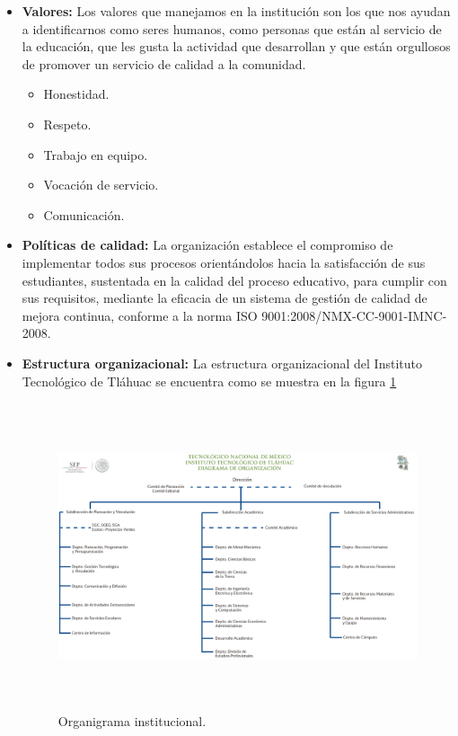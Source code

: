 \begin{itemize}
    \item \textbf{Valores:}  Los valores que manejamos en la instituci\'on son los que nos ayudan a identificarnos como seres humanos, como personas que est\'an al servicio de la educaci\'on, que les gusta la actividad que desarrollan y que est\'an orgullosos de promover un servicio de calidad a la comunidad.
    \begin{itemize}
        \item Honestidad.
        \item Respeto.
        \item Trabajo en equipo.
        \item Vocaci\'on de servicio.
        \item Comunicaci\'on.
    \end{itemize}
    \item \textbf{Pol\'iticas de calidad:} La organizaci\'on establece el compromiso de implementar todos sus procesos orient\'andolos hacia la satisfacci\'on de sus estudiantes, sustentada en la calidad del proceso educativo, para cumplir con sus requisitos, mediante la eficacia de un sistema de gesti\'on de calidad de mejora continua, conforme a la norma ISO 9001:2008/NMX-CC-9001-IMNC-2008.
    
    \item \textbf{Estructura organizacional:} La estructura organizacional del Instituto Tecnol\'ogico de Tl\'ahuac se encuentra como se muestra en la figura \ref{fig_organigrama}

    \begin{figure}[htb]
        \centering
        \includegraphics[width=14cm, height=9cm]{figuras/organigrama}
        \caption{Organigrama institucional.}
        \label{fig_organigrama}
    \end{figure}
\end{itemize}

